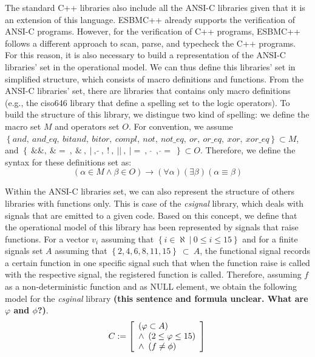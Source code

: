 \documentclass[a4paper]{llncs}
\begin{document}
The standard C++ libraries also include all the ANSI-C libraries given that it is an extension of this language. 
ESBMC++ already supports the verification of ANSI-C programs. However, for the verification of C++ programs, ESBMC++ 
follows a different approach to scan, parse, and typecheck the C++ programs. For this reason, it is also necessary 
to build a representation of the ANSI-C libraries' set in the operational model. We can thus define this libraries' set 
in simplified structure, which consists of macro definitions and functions. From the ANSI-C libraries' set, there are 
libraries that contains only macro definitions (e.g., the ciso646 library that define a spelling set to the logic operators). 
To build the structure of this library, we distingue two kind of spelling: we define the macro set $M$ and operators set $O$. 
For convention, we assume $\left\{and, \: and\_eq, \: bitand, \: bitor, \: compl, \: not, \: not\_eq, \: or, \: or\_eq, \: xor, \: xor\_eq\right\} \subset M$, and 
$\left\{
\: \&\&, 
\: \&= \:, 
\: \& \:, 
\: | \:, 
\: \widetilde{} \:, 
\: ! \:, 
\: || \:, 
\: |= \:, 
\:\: \widehat{} \:\:, 
\: \widehat{}= \: 
\right\} \subset O$. 
Therefore, we define the syntax for these definitions set as:
%
\begin{equation}
\left( \alpha \in M \wedge \beta \in O \right) \rightarrow 		          \left(\forall\alpha\right)\left(\exists\beta\right)\left(\alpha\equiv\beta\right)
\label{eq:csi646-definitions}
\end{equation}

Within the ANSI-C libraries set, we can also represent the structure of others libraries with functions only. 
This is case of the \textit{csignal} library, which deals with signals that are emitted to a given code. 
Based on this concept, we define that the operational model of this library has been represented by signals that
raise functions. For a vector $v_{i}$ assuming that $\left\{ i \in \aleph \:|\: 0 \leq i \leq 15 \right\}$ and 
for a finite signals set $A$ assuming that $\left\{2, 4, 6, 8, 11, 15\right\}\:\subset\:A$, the functional 
signal records a certain function in one specific signal such that when the function raise is called with 
the respective signal, the registered function is called. Therefore, assuming $f$ as a non-deterministic function 
and as NULL element, we obtain the following model for the \textit{csginal} library 
\textbf{(this sentence and formula unclear. What are $\varphi$ and $\phi$?)}.
%
\begin{equation}
\label{c-csignal}
C := \left [ \begin{array}{ll} 
                \left(\varphi \subset A\right) \\
                \wedge \, \, \left(2 \leq \varphi \leq 15\right) \\
                \wedge \, \, \left(f \neq \phi\right) \\
              \end{array} \right ]  \\ 
\end{equation}
\end{document}

